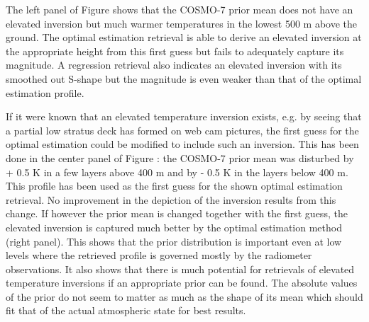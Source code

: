         {}

    The left panel of Figure  shows that the COSMO-7 prior
    mean does not have an elevated inversion but much warmer temperatures in
    the lowest 500 m above the ground. The optimal estimation retrieval is able
    to derive an elevated inversion at the appropriate height from this first
    guess but fails to adequately capture its magnitude. A regression retrieval
    also indicates an elevated inversion with its smoothed out S-shape but
    the magnitude is even weaker than that of the optimal estimation profile.

    If it were known that an elevated temperature inversion exists, e.g.
    by seeing that a partial low stratus deck has formed on web cam pictures,
    the first guess for the optimal estimation could be modified to include
    such an inversion. This has been done in the center panel of Figure
    : the COSMO-7 prior mean was disturbed by + 0.5 K
    in a few layers above 400 m and by - 0.5 K in the layers below 400 m.
    This profile has been used as the first guess for the shown optimal
    estimation retrieval. No improvement in the depiction of the inversion
    results from this change. If however the prior mean is changed together
    with the first guess, the elevated inversion is captured much better by
    the optimal estimation method (right panel). This shows that the prior
    distribution is important even at low levels where the retrieved profile
    is governed mostly by the radiometer observations. It also shows that
    there is much potential for retrievals of elevated temperature inversions
    if an appropriate prior can be found. The absolute values of the prior do
    not seem to matter as much as the shape of its mean which should fit that
    of the actual atmospheric state for best results.

